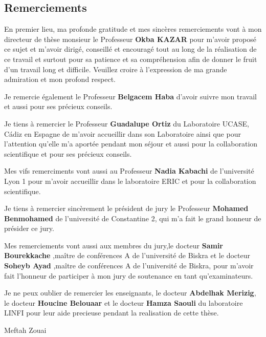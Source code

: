 \thispagestyle{plain}
\begin{itshape}
\chapter*{Remerciements}


En premier lieu, ma profonde gratitude et mes sincères remerciements vont à mon directeur de thèse monsieur le Professeur \textbf{ Okba KAZAR } pour m’avoir proposé ce sujet et m’avoir dirigé, conseillé et encouragé tout au long de la réalisation de ce travail et surtout  pour sa patience et sa compréhension afin de donner le fruit d’un travail long et difficile. Veuillez croire à l’expression de ma grande admiration et mon profond respect. 

Je remercie également le Professeur \textbf{Belgacem Haba} d’avoir suivre mon travail et aussi pour ses précieux conseils.

Je tiens à remercier le Professeur \textbf{Guadalupe Ortiz} du Laboratoire UCASE, Cádiz en Espagne de m'avoir accueillir dans son Laboratoire ainsi que pour l'attention qu'elle m'a aportée pendant mon séjour et aussi pour la collaboration scientifique et pour ses précieux conseils.

Mes vifs remerciments vont aussi au Professeur \textbf{Nadia Kabachi} de l'université Lyon 1 pour m'avoir accueillir dans le laboratoire ERIC  et pour la collaboration scientifique.

Je tiens à remercier sincèrement le président de jury le Professeur \textbf{Mohamed Benmohamed} de l'université de Constantine 2,  qui m’a fait le grand honneur de présider ce jury.

Mes remerciements vont aussi aux membres du jury,le docteur \textbf{Samir Bourekkache} ,maître de conférences A de l'université de Biskra et le docteur  \textbf{Soheyb Ayad} ,maître de conférences A de l'université de Biskra,  pour m’avoir fait l’honneur de participer à mon jury de soutenance en tant qu’examinateurs.

Je ne peux oublier de remercier les enseignants, le docteur \textbf{Abdelhak Merizig}, le docteur \textbf{Houcine Belouaar} et le docteur \textbf{Hamza Saouli} du laboratoire LINFI pour leur aide precieuse pendant la realisation de cette thèse.

\end{itshape}


\begin{flushright}
Meftah Zouai\\[1pc]

\end{flushright}